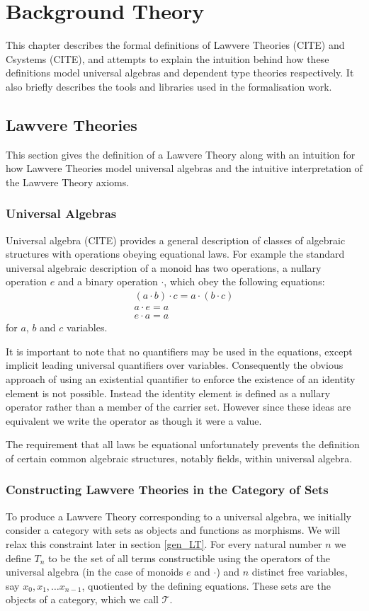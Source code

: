 \chapter{Background Theory}
This chapter describes the formal definitions of Lawvere Theories (CITE) and
Csystems (CITE), and attempts to explain the intuition behind how these
definitions model universal algebras and dependent type theories respectively.
It also briefly describes the tools and libraries used in the formalisation
work.

\section{Lawvere Theories}
This section gives the definition of a Lawvere Theory along with an intuition
for how Lawvere Theories model universal algebras and the intuitive
interpretation of the Lawvere Theory axioms. 

\subsection{Universal Algebras}
Universal algebra (CITE) provides a general description of classes of algebraic
structures with operations obeying equational laws. For example the standard
universal algebraic description of a monoid has two operations, a nullary
operation $e$ and a binary operation $\cdot$, which obey the following
equations:
\begin{gather*}
    (a\cdot b)\cdot c = a\cdot (b\cdot c) \\
    a \cdot e = a \\
    e \cdot a = a
\end{gather*}
for $a$, $b$ and $c$ variables.

It is important to note that no quantifiers may be used in the equations, except
implicit leading universal quantifiers over variables. Consequently the obvious
approach of using an existential quantifier to enforce the existence of an
identity element is not possible. Instead the identity element is defined as a
nullary operator rather than a member of the carrier set. However since these
ideas are equivalent we write the operator as though it were a value.

The requirement that all laws be equational unfortunately prevents the
definition of certain common algebraic structures, notably fields, within
universal algebra.

\subsection{Constructing Lawvere Theories in the Category of Sets}
To produce a Lawvere Theory corresponding to a universal algebra, we initially
consider a category with sets as objects and functions as morphisms. We will
relax this constraint later in section \ref{gen_LT}. For every natural number
$n$ we define $T_n$ to be the set of all terms constructible using the operators
of the universal algebra (in the case of monoids $e$ and $\cdot$) and $n$
distinct free variables, say $x_0, x_1,\ldots x_{n-1}$, quotiented by the
defining equations. These sets are the objects of a category, which we call
$\mathcal{T}$.

